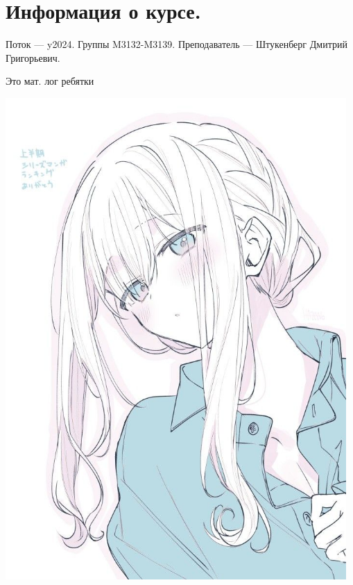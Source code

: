\section{Информация о курсе.}
Поток — y2024.\newline
Группы M3132-M3139.\newline
Преподаватель --- Штукенберг Дмитрий Григорьевич.\par

Это мат. лог ребятки
\begin{center}
   \includegraphics[width=13cm]{assets/girl.jpg}
\end{center}